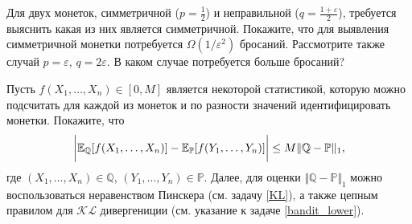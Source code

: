 \begin{problem}
Для двух монеток, симметричной ($p = \frac{1}{2}$) и неправильной ($q = \frac{1 +\varepsilon}{2}$), требуется выяснить какая из них является симметричной. Покажите, что для выявления симметричной монетки потребуется $\Omega (1 / \varepsilon^2)$ бросаний. Рассмотрите также случай $p = \varepsilon$, $q = 2 \varepsilon$. В каком случае потребуется больше бросаний? 

\end{problem}

\begin{ordre}
Пусть $f(X_1,\ldots, X_n) \in [0, M]$ является некоторой статистикой, которую можно подсчитать для каждой из монеток и по разности значений идентифицировать монетки. Покажите, что 
\[
\bigg\vert \mathrm{{\mathbb E}}_{ \mathbb{Q} }[ f(X_1,\ldots, X_n) ] - \mathrm{{\mathbb E}}_{ \mathbb{P} }[ f(Y_1,\ldots, Y_n) ]  \bigg\vert 
\leq  M \Vert \mathbb{Q} - \mathbb{P} \Vert_1,
\]   
где $(X_1,\ldots, X_n) \in \mathbb{Q}$, $(Y_1,\ldots, Y_n) \in \mathbb{P}$. Далее, для оценки $ \Vert \mathbb{Q} - \mathbb{P} \Vert_1$ можно воспользоваться неравенством Пинскера (см. задачу \ref{KL}), а также цепным правилом для $\mathcal{KL}$ дивергениции (см. указание к задаче \ref{bandit_lower}).
\end{ordre}



